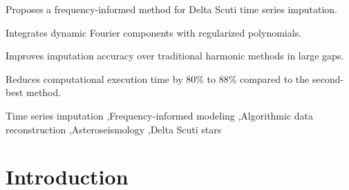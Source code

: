 \documentclass[a4paper,fleqn]{cas-sc}
\begin{document}
\begin{highlights}
\item Proposes a frequency-informed method for Delta Scuti time series imputation.
\item Integrates dynamic Fourier components with regularized polynomials.
\item Improves imputation accuracy over traditional harmonic methods in large gaps.
\item Reduces computational execution time by 80\% to 88\% compared to the second-best method.
\end{highlights}
\begin{keywords}
Time series imputation \sep Frequency-informed modeling \sep Algorithmic data reconstruction \sep Asteroseismology \sep Delta Scuti stars



\end{keywords}


\maketitle


\section{Introduction} \label{sec:introduccion}
\end{document}
